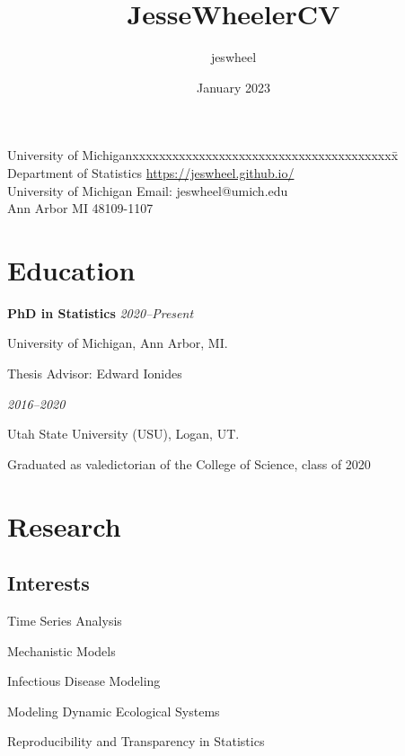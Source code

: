 \documentclass[11pt]{article}
\title{JesseWheelerCV}
\author{jeswheel }
\date{January 2023}
\newenvironment {interests}
                {
                 \begin{list}{}
                 {\setlength{\labelwidth}{0mm}
                  \setlength{\leftmargin}{8mm}
                  \setlength{\itemindent}{-3mm}
                  \setlength{\labelsep}{0mm}
                  \setlength{\parsep}{0.1 ex}
                  \setlength{\itemsep}{1pt}
      \setlength{\topsep}{0.15cm}}} %
   {\end{list}}
\begin{document}
\thispagestyle{empty}  %

\rule{0mm}{1mm}
\vspace{-20mm}


\vspace{1mm}

\rule{0mm}{1mm}


\begin{tabbing}
University of Michiganxxxxxxxxxxxxxxxxxxxxxxxxxxxxxxxxxxxxxxxx\= \kill
Department of Statistics \>  %
{\url{https://jeswheel.github.io/}}
\\
University of Michigan\> %
Email: {jeswheel@umich.edu}
\\
Ann Arbor MI 48109-1107 \>
\end{tabbing}

\section*{Education}

{\bf PhD in Statistics} \hfill {\textit{2020--Present}}

University of Michigan, Ann Arbor, MI.

Thesis Advisor: Edward Ionides

 \hfill  {\textit{2016--2020}}

Utah State University (USU), Logan, UT.

Graduated as valedictorian of the College of Science, class of 2020

\section*{Research}
\subsection*{Interests}
\begin{interests}
    \item Time Series Analysis
    \item Mechanistic Models
    \item Infectious Disease Modeling
    \item Modeling Dynamic Ecological Systems
    \item Reproducibility and Transparency in Statistics

\end{interests}
\end{document}
